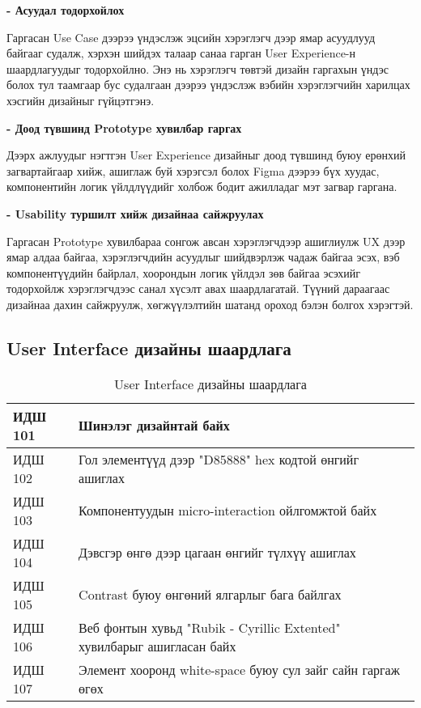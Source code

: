 \textbf{- Асуудал тодорхойлох}

Гаргасан Use Case дээрээ үндэслэж эцсийн хэрэглэгч дээр ямар асуудлууд байгааг судалж, хэрхэн шийдэх талаар санаа гарган User Experience-н шаардлагуудыг тодорхойлно. Энэ нь хэрэглэгч төвтэй дизайн гаргахын үндэс болох тул таамгаар бус судалгаан дээрээ үндэслэж вэбийн хэрэглэгчийн харилцах хэсгийн дизайныг гүйцэтгэнэ.

\textbf{- Доод түвшинд Prototype хувилбар гаргах}

Дээрх ажлуудыг нэгтгэн User Experience дизайныг доод түвшинд буюу ерөнхий загвартайгаар хийж, ашиглаж буй хэрэгсэл болох Figma дээрээ бүх хуудас, компонентийн логик үйлдлүүдийг холбож бодит ажилладаг мэт загвар гаргана.

\textbf{- Usability туршилт хийж дизайнаа сайжруулах}

Гаргасан Prototype хувилбараа сонгож авсан хэрэглэгчдээр ашиглиулж UX дээр ямар алдаа байгаа, хэрэглэгчдийн асуудлыг шийдвэрлэж чадаж байгаа эсэх, вэб компонентүүдийн байрлал, хоорондын логик үйлдэл зөв байгаа эсэхийг тодорхойлж хэрэглэгчдээс санал хүсэлт авах шаардлагатай. Түүний дараагаас дизайнаа дахин сайжруулж, хөгжүүлэлтийн шатанд ороход бэлэн болгох хэрэгтэй.

\subsection{User Interface дизайны шаардлага}

\begin{table}[h]
	\centering
	\caption{User Interface дизайны шаардлага}
	\begin{tabular}{ |p{2cm}|p{13cm}| }
		\hline
		ИДШ 101 & Шинэлэг дизайнтай байх                                                 \\ \hline
		ИДШ 102 & Гол элементүүд дээр "D85888" hex кодтой өнгийг ашиглах                 \\ \hline
		ИДШ 103 & Компонентуудын micro-interaction ойлгомжтой байх                       \\ \hline
		ИДШ 104 & Дэвсгэр өнгө дээр цагаан өнгийг түлхүү ашиглах                         \\ \hline
		ИДШ 105 & Contrast буюу өнгөний ялгарлыг бага байлгах                            \\ \hline
		ИДШ 106 & Веб фонтын хувьд "Rubik - Cyrillic Extented" хувилбарыг ашигласан байх \\ \hline
		ИДШ 107 & Элемент хооронд white-space буюу сул зайг сайн гаргаж өгөх             \\  \hline
	\end{tabular}
\end{table}